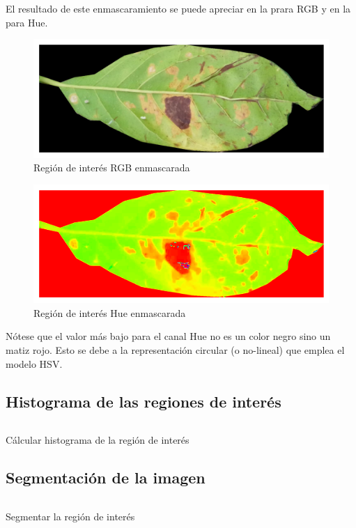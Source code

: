 El resultado de este enmascaramiento se puede apreciar en la  prara \textsf{RGB} y en la  para \textsf{Hue}.

\begin{figure}[!ht]
\centering
\includegraphics[scale=1]{images/masked_roi_rgb.png}
\caption{Región de interés RGB enmascarada}
\label{img:masked_roi_rgb}
\end{figure}

\begin{figure}[!ht]
\centering
\includegraphics[scale=1]{images/masked_roi_hue.png}
\caption{Región de interés Hue enmascarada}
\label{img:masked_roi_hue}
\end{figure}

Nótese que el valor más bajo para el canal Hue no es un color negro sino un matiz rojo. Esto se debe a la representación circular (o no-lineal) que emplea el modelo \textsf{HSV}.

\subsection{Histograma de las regiones de interés}
\begin{listing}[!ht]
\inputminted{python}{code_listings/histogram.py}
\caption{Cálcular histograma de la región de interés}
\label{code:histogram}
\end{listing}

\subsection{Segmentación de la imagen}
\begin{listing}[!ht]
\inputminted{python}{code_listings/segmentation.py}
\caption{Segmentar la región de interés}
\label{code:segmentation}
\end{listing}

